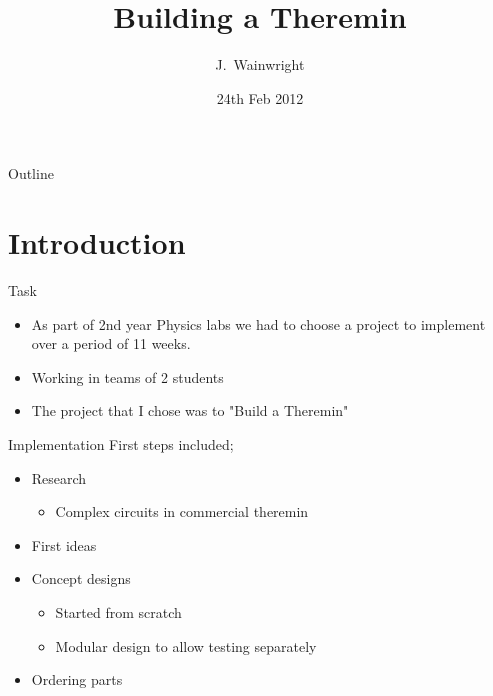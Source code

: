 \documentclass{beamer}
\title[Theremin\hspace{2em}\insertframenumber/
\inserttotalframenumber]{Building a Theremin}
\author[Wainwright] %
{J.~Wainwright}
\institute[Universities of Somewhere and Elsewhere] %
{
  Department of Physics and Astronomy\\
  University of Birmingham}
\date[Short Occasion] %
{24th Feb 2012}
\begin{document}
\begin{frame}
	\titlepage
\end{frame}

{
\begin{frame}{Outline}
	\tableofcontents%
\end{frame}
}

\section{Introduction}

\begin{frame}{Task}
	\begin{itemize}
		\item As part of 2nd year Physics labs we had to choose a project to implement over a period of 11 weeks.
		\item Working in teams of 2 students
		\item The project that I chose was to "Build a Theremin"
	\end{itemize}
\end{frame}

\begin{frame}{Implementation}
First steps included;
	\begin{itemize}
		\item Research
		\begin{itemize}
			\item Complex circuits in commercial theremin
		\end{itemize}
		\item First ideas
		\item Concept designs
		\begin{itemize}
			\item Started from scratch
			\item Modular design to allow testing separately
		\end{itemize}
		\item Ordering parts
	\end{itemize} 
\end{frame}
\end{document}
